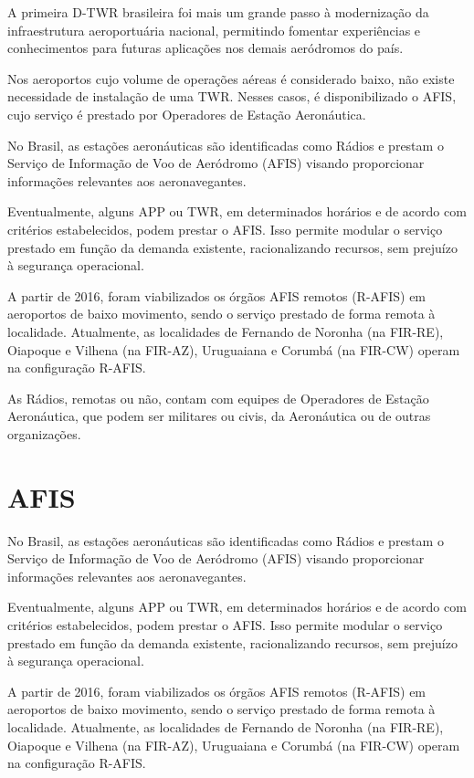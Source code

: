 \documentclass[
]{book}
\begin{document}
A primeira D-TWR brasileira foi mais um grande passo à modernização da infraestrutura aeroportuária nacional, permitindo fomentar experiências e conhecimentos para futuras aplicações nos demais aeródromos do país.

Nos aeroportos cujo volume de operações aéreas é considerado baixo, não existe necessidade de instalação de uma TWR. Nesses casos, é disponibilizado o AFIS, cujo serviço é prestado por Operadores de Estação Aeronáutica.

No Brasil, as estações aeronáuticas são identificadas como Rádios e prestam o Serviço de Informação de Voo de Aeródromo (AFIS) visando proporcionar informações relevantes aos aeronavegantes.

Eventualmente, alguns APP ou TWR, em determinados horários e de acordo com critérios estabelecidos, podem prestar o AFIS. Isso permite modular o serviço prestado em função da demanda existente, racionalizando recursos, sem prejuízo à segurança operacional.

A partir de 2016, foram viabilizados os órgãos AFIS remotos (R-AFIS) em aeroportos de baixo movimento, sendo o serviço prestado de forma remota à localidade. Atualmente, as localidades de Fernando de Noronha (na FIR-RE), Oiapoque e Vilhena (na FIR-AZ), Uruguaiana e Corumbá (na FIR-CW) operam na configuração R-AFIS.

As Rádios, remotas ou não, contam com equipes de Operadores de Estação Aeronáutica, que podem ser militares ou civis, da Aeronáutica ou de outras organizações.

\hypertarget{afis}{%
\section{AFIS}\label{afis}}

No Brasil, as estações aeronáuticas são identificadas como Rádios e prestam o Serviço de Informação de Voo de Aeródromo (AFIS) visando proporcionar informações relevantes aos aeronavegantes.

Eventualmente, alguns APP ou TWR, em determinados horários e de acordo com critérios estabelecidos, podem prestar o AFIS. Isso permite modular o serviço prestado em função da demanda existente, racionalizando recursos, sem prejuízo à segurança operacional.

A partir de 2016, foram viabilizados os órgãos AFIS remotos (R-AFIS) em aeroportos de baixo movimento, sendo o serviço prestado de forma remota à localidade. Atualmente, as localidades de Fernando de Noronha (na FIR-RE), Oiapoque e Vilhena (na FIR-AZ), Uruguaiana e Corumbá (na FIR-CW) operam na configuração R-AFIS.
\end{document}
